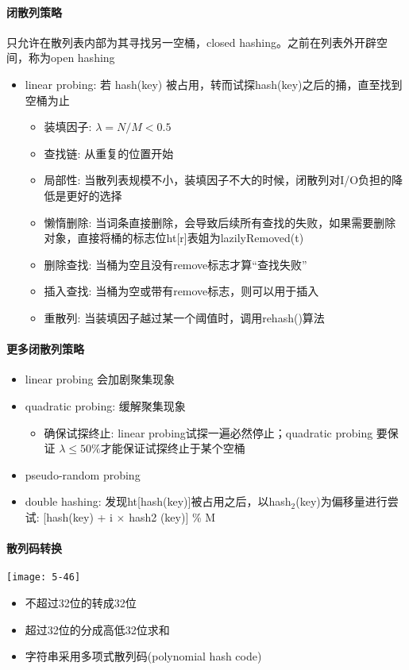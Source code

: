 \paragraph{闭散列策略}
只允许在散列表内部为其寻找另一空桶，closed hashing。之前在列表外开辟空间，称为open hashing

\begin{itemize}
\item linear probing: 若 hash(key) 被占用，转而试探hash(key)之后的捅，直至找到空桶为止
\begin{itemize}
\item 装填因子: $\lambda=N / M < 0.5$
\item 查找链: 从重复的位置开始
\item 局部性: 当散列表规模不小，装填因子不大的时候，闭散列对I/O负担的降低是更好的选择
\item 懒惰删除: 当词条直接删除，会导致后续所有查找的失败，如果需要删除对象，直接将桶的标志位ht[r]表姐为lazilyRemoved(t)
\item 删除查找: 当桶为空且没有remove标志才算``查找失败''
\item 插入查找: 当桶为空或带有remove标志，则可以用于插入
\item 重散列: 当装填因子越过某一个阈值时，调用rehash()算法
\end{itemize}
\end{itemize}

\paragraph{更多闭散列策略}
\begin{itemize}
\item linear probing 会加剧聚集现象
\item quadratic probing: 缓解聚集现象
\begin{itemize}
\item 确保试探终止: linear probing试探一遍必然停止；quadratic probing 要保证 $\lambda \leq 50\%$才能保证试探终止于某个空桶
\end{itemize}
\item pseudo-random probing
\item double hashing: 发现ht[hash(key)]被占用之后，以hash$_2$(key)为偏移量进行尝试: [hash(key) + i $\times$ hash2 (key)] \% M
\end{itemize}

\paragraph{散列码转换}
\texttt{[image: 5-46]}
\begin{itemize}
\item 不超过32位的转成32位
\item 超过32位的分成高低32位求和
\item 字符串采用多项式散列码(polynomial hash code)
\end{itemize}

